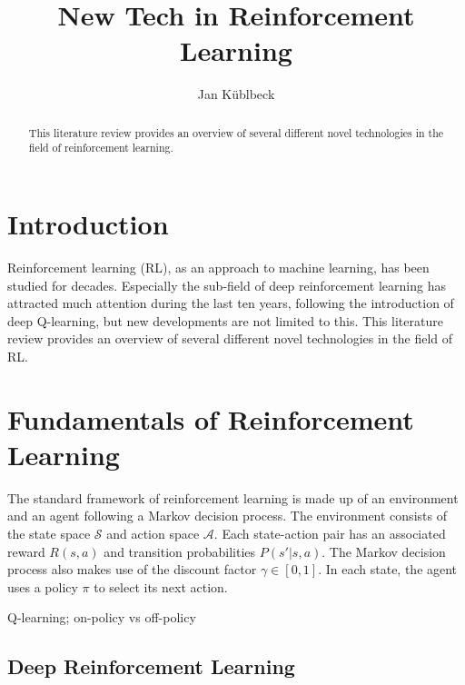 \documentclass[runningheads]{llncs}
\begin{document}
%
\title{New Tech in Reinforcement Learning}
%
%
\author{Jan Küblbeck}
%
%
%
\maketitle              %
%
\begin{abstract}
This literature review provides an overview of several different novel technologies in the field of reinforcement learning. %
\end{abstract}
%
%
%
\section{Introduction}

Reinforcement learning (RL), as an approach to machine learning, has been studied for decades. Especially the sub-field of deep reinforcement learning has attracted much attention during the last ten years, following the introduction of deep Q-learning, but new developments are not limited to this. This literature review provides an overview of several different novel technologies in the field of RL.

\section{Fundamentals of Reinforcement Learning}

The standard framework of reinforcement learning \cite{sutton2018reinforcement} is made up of an environment and an agent following a Markov decision process. The environment consists of the state space $\mathcal{S}$ and action space $\mathcal{A}$. Each state-action pair has an associated reward $R(s,a)$ and transition probabilities $P(s'|s,a)$. The Markov decision process also makes use of the discount factor $\gamma \in [0,1]$. In each state, the agent uses a policy $\pi$ to select its next action.

Q-learning; on-policy vs off-policy

\subsection{Deep Reinforcement Learning}
\end{document}
